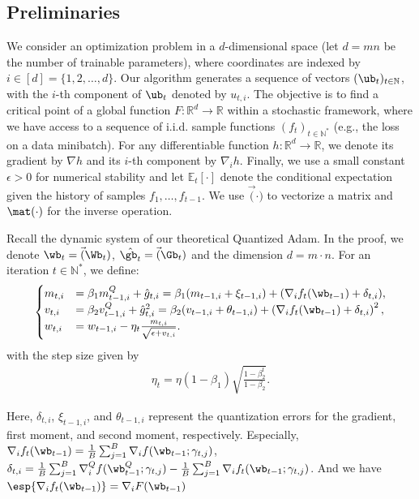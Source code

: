 \documentclass[11pt, letterpaper]{article}
\begin{document}
\subsection{Preliminaries}\label{equal}
We consider an optimization problem in a $d$-dimensional space (let $d=mn$ be the number of trainable parameters), where coordinates are indexed by $i \in [d] = \{1, 2, \ldots, d\}$. Our algorithm generates a sequence of vectors $(\ub_t)_{t\in\mathbb{N}}$, with the $i$-th component of $\ub_t$ denoted by $u_{t,i}$. The objective is to find a critical point of a global function $F: \mathbb{R}^d \rightarrow \mathbb{R}$ within a stochastic framework, where we have access to a sequence of i.i.d. sample functions $(f_t)_{t \in \mathbb{N}^*}$ (e.g., the loss on a data minibatch). For any differentiable function $h: \mathbb{R}^d \rightarrow \mathbb{R}$, we denote its gradient by $\nabla h$ and its $i$-th component by $\nabla_i h$. Finally, we use a small constant $\epsilon > 0$ for numerical stability and let $\mathbb{E}_t[\cdot]$ denote the conditional expectation given the history of samples $f_1, \ldots, f_{t-1}$. We use $\vec(\cdot)$ to vectorize a matrix and $\mat(\cdot)$ for the inverse operation.

Recall the dynamic system of our theoretical Quantized Adam. In the proof, we denote $\wb_t=\vec(\Wb_t)$, $\hat{\gb_t}=\vec(\Gb_t)$ and the dimension $d=m \cdot n$. For an iteration $t \in \mathbb{N}^*$, we define:
\begin{align}
    \label{app:eq:system}
    \begin{cases}
    m_{t, i} &= \beta_1  m_{t-1, i}^Q+ \hat{g}_{t,i}=\beta_1 ( m_{t-1, i}+\xi_{t-1,i}) + (\nabla_i f_t(\wb_{t-1})+\delta_{t,i}),\\
    v_{t, i} &= \beta_2  v_{t-1, i}^Q + \hat{g}_{t,i}^2=\beta_2 (v_{t-1, i}+\theta_{t-1,i}) + \left(\nabla_i f_t(\wb_{t-1})+\delta_{t,i}\right)^2,\\
    w_{t, i} &= w_{t-1, i} - \eta_t \frac{m_{t, i}}{\sqrt{\epsilon + v_{t, i}}}.
    \end{cases}
\end{align}
with the step size given by
\begin{align}
\label{app:eq:alpha_adam}
    \eta_t = \eta (1 - \beta_1) \sqrt{\frac{1-\beta_2^t}{1 - \beta_2}}.
\end{align}

Here, $\delta_{t,i}$, $\xi_{t-1,i}$, and $\theta_{t-1,i}$ represent the quantization errors for the gradient, first moment, and second moment, respectively. Especially, $\nabla_i f_t(\wb_{t-1})=\frac{1}{B}\sum_{j=1}^B\nabla_if(\wb_{t-1};\gamma_{t,j})$, $\delta_{t,i}=\frac{1}{B}\sum_{j=1}^{B}\nabla_i^Q f(\wb_{t-1}^Q; \gamma_{t,j})-\frac{1}{B}\sum_{j=1}^B\nabla_if_t(\wb_{t-1};\gamma_{t,j})$. And we have $\esp{\nabla_if_t(\wb_{t-1})}=\nabla_iF(\wb_{t-1})$
\end{document}
